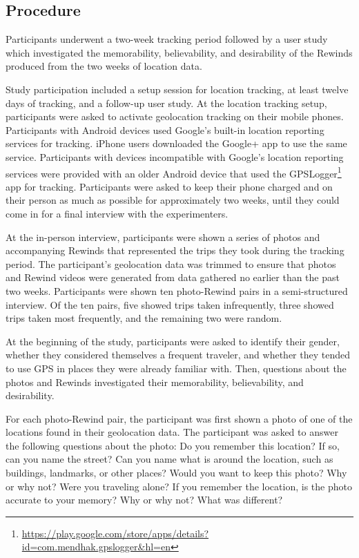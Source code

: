 \documentclass{sigchi}
\begin{document}
\subsection{Procedure}
Participants underwent a two-week tracking period followed by a user study which investigated the memorability, believability, and desirability of the Rewinds produced from the two weeks of location data.

Study participation included a setup session for location tracking, at least twelve days of tracking, and a follow-up user study. At the location tracking setup, participants were asked to activate geolocation tracking on their mobile phones. Participants with Android devices used Google's built-in location reporting services for tracking. iPhone users downloaded the Google+ app to use the same service. Participants with devices incompatible with Google's location reporting services were provided with an older Android device that used the GPSLogger\footnote{\url{https://play.google.com/store/apps/details?id=com.mendhak.gpslogger&hl=en}} app for tracking. Participants were asked to keep their phone charged and on their person as much as possible for approximately two weeks, until they could come in for a final interview with the experimenters.

At the in-person interview, participants were shown a series of photos and accompanying Rewinds that represented the trips they took during the tracking period. The participant's geolocation data was trimmed to ensure that photos and Rewind videos were generated from data gathered no earlier than the past two weeks. Participants were shown ten photo-Rewind pairs in a semi-structured interview.  Of the ten pairs, five showed trips taken infrequently, three showed trips taken most frequently, and the remaining two were random. 

At the beginning of the study, participants were asked to identify their gender, whether they considered themselves a frequent traveler, and whether they tended to use GPS in places they were already familiar with.
Then, questions about the photos and Rewinds investigated their memorability, believability, and desirability.

For each photo-Rewind pair, the participant was first shown a photo of one of the locations found in their geolocation data. The participant was asked to answer the following questions about the photo: Do you remember this location? If so, can you name the street? Can you name what is around the location, such as buildings, landmarks, or other places? Would you want to keep this photo? Why or why not? Were you traveling alone? If you remember the location, is the photo accurate to your memory? Why or why not? What was different?
\end{document}
